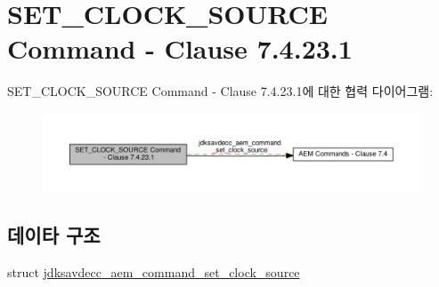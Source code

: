 \hypertarget{group__command__set__clock__source}{}\section{S\+E\+T\+\_\+\+C\+L\+O\+C\+K\+\_\+\+S\+O\+U\+R\+CE Command -\/ Clause 7.4.23.1}
\label{group__command__set__clock__source}
S\+E\+T\+\_\+\+C\+L\+O\+C\+K\+\_\+\+S\+O\+U\+R\+CE Command -\/ Clause 7.4.23.1에 대한 협력 다이어그램\+:
\nopagebreak
\begin{figure}[H]
\begin{center}
\leavevmode
\includegraphics[width=350pt]{group__command__set__clock__source}
\end{center}
\end{figure}
\subsection*{데이타 구조}
\begin{DoxyCompactItemize}
\item 
struct \hyperlink{structjdksavdecc__aem__command__set__clock__source}{jdksavdecc\+\_\+aem\+\_\+command\+\_\+set\+\_\+clock\+\_\+source}
\end{DoxyCompactItemize}
